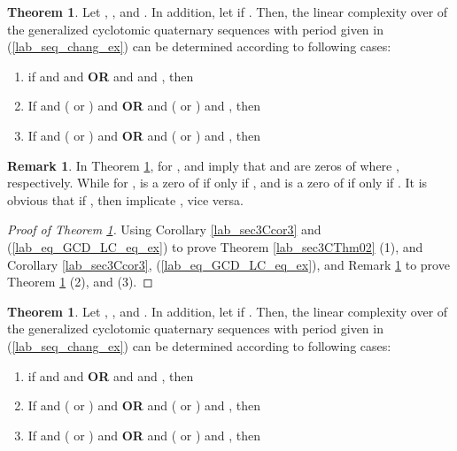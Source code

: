 \documentclass{mcom-l}
\theoremstyle{definition}
\newtheorem{sec3Cremark3}[sec3_remark1]{Remark}
\newtheorem{sec3CThm03}[sec3thm1]{Theorem}
\newtheorem{sec3CThm04}[sec3thm1]{Theorem}
\numberwithin{equation}{section}
\begin{document}
    \begin{sec3CThm03}\label{lab_sec3CThm03}
     Let , ,  and . In addition, let   if . Then, the linear complexity over  of the generalized cyclotomic quaternary sequences with period  given in (\ref{lab_seq_chang_ex}) can be determined according to following cases:
     \begin{enumerate} \item if  and  and  \textbf{OR}  and  and , then 
     
     
       \item If  and ( or ) and  \textbf{OR}  and ( or ) and , then
      
       
         \item If   and ( or ) and  \textbf{OR}  and ( or ) and , then
        
       \end{enumerate}
        \end{sec3CThm03}
    \begin{sec3Cremark3}\label{Lab_sec3Cremark3}
    In Theorem \ref{lab_sec3CThm03}, for ,  and  imply that  and  are zeros of  where , respectively. While for ,  is a zero of  if only if , and  is a zero of  if only if . It is obvious that if , then  implicate , vice versa.
    \end{sec3Cremark3}
    \begin{proof}[Proof of Theorem \ref{lab_sec3CThm03}]
            Using Corollary \ref{lab_sec3Ccor3} and (\ref{lab_eq_GCD_LC_eq_ex}) to prove Theorem \ref{lab_sec3CThm02} (1), and  Corollary \ref{lab_sec3Ccor3}, (\ref{lab_eq_GCD_LC_eq_ex}), and Remark \ref{Lab_sec3Cremark3} to prove Theorem \ref{lab_sec3CThm03} (2), and (3).
     \end{proof}
    \begin{sec3CThm04}\label{lab_sec3CThm04}
    Let , ,  and . In addition, let  if . Then, the linear complexity over  of the generalized cyclotomic quaternary sequences with period  given in (\ref{lab_seq_chang_ex}) can be determined according to following cases: 
    \begin{enumerate}
     \item if  and  and  \textbf{OR}   and  and , then 
           
    \item If  and (  or ) and  \textbf{OR}  and (  or ) and , then
             
    \item If   and ( or ) and  \textbf{OR }   and ( or ) and , then
                  
            \end{enumerate}
    \end{sec3CThm04}
\end{document}
